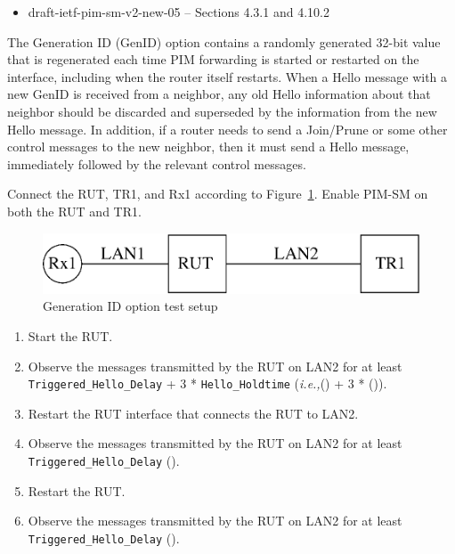 \documentclass[11pt]{report}
\newcommand{\ie}{\emph{i.e.,}\xspace}
\begin{document}
\begin{itemize}
  \item draft-ietf-pim-sm-v2-new-05 -- Sections 4.3.1 and 4.10.2
\end{itemize}

The Generation ID (GenID) option contains a randomly generated 32-bit value
that is regenerated each time PIM forwarding is started or restarted on the
interface, including when the router itself restarts. When a Hello message
with a new GenID is received from a neighbor, any old Hello information about
that neighbor should be discarded and superseded by the information from the
new Hello message. In addition, if a router needs to send a Join/Prune or some
other control messages to the new neighbor, then it must send a Hello
message, immediately followed by the relevant control messages.

Connect the RUT, TR1, and Rx1 according to
Figure~\ref{fig:pim_test_2_6_generation_id_option}.
Enable PIM-SM on both the RUT and TR1.

\begin{figure}[htbp]
  \begin{center}
    \includegraphics[scale=0.8]{figs/pim_test_2_6_generation_id_option}
    \caption{Generation ID option test setup}
    \label{fig:pim_test_2_6_generation_id_option}
  \end{center}
\end{figure}



\begin{enumerate}

  \item Start the RUT.

  \item Observe the messages transmitted by the RUT on LAN2 for at least
        \verb=Triggered_Hello_Delay= + 3 * \verb=Hello_Holdtime=
        (\ie ({\PimsmTriggeredHelloDelay}) + 3 * ({\PimsmHelloHoldtime})).

  \item Restart the RUT interface that connects the RUT to LAN2.

  \item Observe the messages transmitted by the RUT on LAN2 for at least
        \verb=Triggered_Hello_Delay= ({\PimsmTriggeredHelloDelay}).

  \item Restart the RUT.

  \item Observe the messages transmitted by the RUT on LAN2 for at least
        \verb=Triggered_Hello_Delay= ({\PimsmTriggeredHelloDelay}).

\end{enumerate}
\end{document}
